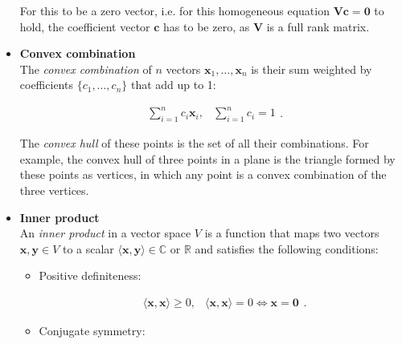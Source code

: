 \documentclass[10pt,b5paper,titlepage]{book}
\begin{document}
\begin{itemize}
        For this to be a zero vector, i.e. for this homogeneous equation
        $\mathbf{V} \mathbf{c} = \mathbf{0}$ to hold, the coefficient vector
        $\mathbf{c}$ has to be zero, as $\mathbf{V}$ is a full rank matrix.


    \item \textbf{Convex combination}\\

        The \textit{convex combination} of $n$ vectors $\mathbf{x}_{1}, \ldots, \mathbf{x}_{n}$
        is their sum weighted by coefficients $\{c_1, \ldots, c_{n}\}$
        that add up to 1:

        \begin{equation}
            \begin{array}{lr}
                \sum_{i=1}^{n} c_{i} \mathbf{x}_{i}, & \sum_{i=1}^{n} c_{i} = 1
            \end{array}
        .\end{equation}

        The \textit{convex hull} of these points is the set of all their combinations.
        For example, the convex hull of three points in a plane is the triangle
        formed by these points as vertices, in which any point is a convex
        combination of the three vertices.

    \item \textbf{Inner product}\\

        An \textit{inner product} in a vector space $V$ is a function that maps
        two vectors $\mathbf{x}, \mathbf{y} \in V$ to a scalar
        $\langle \mathbf{x}, \mathbf{y} \rangle \in \mathbb{C}$ or $\mathbb{R}$
        and satisfies the following conditions:

        \begin{itemize}
            \item Positive definiteness:

                \begin{equation}
                    \begin{array}{lr}
                        \langle \mathbf{x}, \mathbf{x} \rangle \ge 0, &
                        \langle \mathbf{x}, \mathbf{x} \rangle = 0 \iff \mathbf{x} = \mathbf{0}
                    \end{array}
                .\end{equation}

            \item Conjugate symmetry:


\end{itemize}
\end{itemize}
\end{document}

